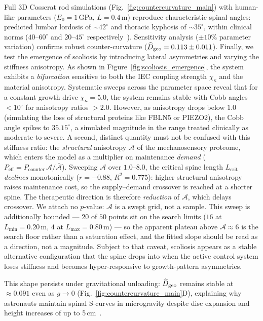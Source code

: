 Full 3D Cosserat rod simulations (Fig.~\ref{fig:countercurvature_main}) with human-like parameters ($E_0 = 1$\,GPa, $L = 0.4$\,m) reproduce characteristic spinal angles: predicted lumbar lordosis of ${\sim}42^\circ$ and thoracic kyphosis of ${\sim}35^\circ$, within clinical norms ($40$--$60^\circ$ and $20$--$45^\circ$ respectively~\cite{white1990clinical}). Sensitivity analysis ($\pm 10\%$ parameter variation) confirms robust counter-curvature ($\widehat{D}_{\mathrm{geo}} = 0.113 \pm 0.011$).
Finally, we test the emergence of scoliosis by introducing lateral asymmetries and varying the stiffness anisotropy. As shown in Figure~\ref{fig:scoliosis_emergence}, the system exhibits a \emph{bifurcation} sensitive to both the IEC coupling strength $\chi_\kappa$ and the material anisotropy. Systematic sweeps across the parameter space  reveal that for a constant growth drive $\chi_\kappa = 5.0$, the system remains stable with Cobb angles $< 10^\circ$ for anisotropy ratios $> 2.0$. However, as anisotropy drops below $1.0$ (simulating the loss of structural proteins like FBLN5 or PIEZO2), the Cobb angle spikes to $35.15^\circ$, a simulated magnitude in the range treated clinically as moderate-to-severe. A second, distinct quantity must not be confused with this stiffness ratio: the \emph{structural} anisotropy $\mathcal{A}$ of the mechanosensory proteome, which enters the model as a multiplier on maintenance \emph{demand} ($P_{\mathrm{eff}} = P_{\mathrm{counter}}\,\mathcal{A}/\bar{\mathcal{A}}$). Sweeping $\mathcal{A}$ over $1.0$--$8.0$, the critical spine length $L_{\mathrm{crit}}$ \emph{declines} monotonically ($r = -0.88$, $R^2 = 0.775$): higher structural anisotropy raises maintenance cost, so the supply--demand crossover is reached at a shorter spine. The therapeutic direction is therefore \emph{reduction} of $\mathcal{A}$, which delays crossover. We attach no $p$-value: $\mathcal{A}$ is a swept grid, not a sample. This sweep is additionally bounded --- $20$ of $50$ points sit on the search limits ($16$ at $L_{\min}=0.20$\,m, $4$ at $L_{\max}=0.80$\,m) --- so the apparent plateau above $\mathcal{A} \approx 6$ is the search floor rather than a saturation effect, and the fitted slope should be read as a direction, not a magnitude. Subject to that caveat, scoliosis appears as a stable alternative configuration that the spine drops into when the active control system loses stiffness and becomes hyper-responsive to growth-pattern asymmetries.

This shape persists under gravitational unloading: $\widehat{D}_{\mathrm{geo}}$ remains stable at $\approx 0.091$ even as $g \to 0$ (Fig.~\ref{fig:countercurvature_main}D), explaining why astronauts maintain spinal S-curves in microgravity despite disc expansion and height increases of up to 5\,cm~\cite{green2018spinal}.


